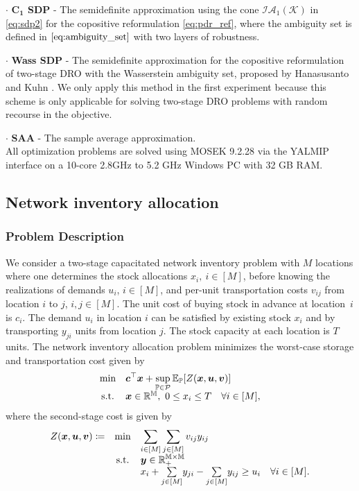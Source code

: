 \documentclass{article}
\newcommand{\st}{\textnormal{s.t.}}
\newcommand{\PP}{\mathbb{P}}
\newcommand{\EE}{\mathbb{E}}
\begin{document}
$\bm \cdot$ \textbf{$\mathbf{C_1}$ SDP} - The semidefinite approximation using the cone $\mathcal{IA}_1\mathcal{(K)}$   in \eqref{eq:sdp2}  for the copositive reformulation \eqref{eq:pdr_ref}, where the ambiguity set is defined in $\eqref{eq:ambiguity_set}$ with two layers of robustness.

$\bm \cdot$ \textbf{Wass SDP} - The semidefinite approximation for the copositive reformulation of two-stage DRO with the Wasserstein ambiguity set, proposed by Hanasusanto and Kuhn \cite{Wass-SDP}. We only apply this method in the first experiment because this scheme is only applicable for solving two-stage DRO problems with random recourse in the objective.

$\bm \cdot$ \textbf{SAA} - The sample average approximation.\\
All optimization problems are solved using MOSEK 9.2.28 via the YALMIP interface on a 10-core 2.8GHz to 5.2 GHz Windows PC with 32 GB RAM.

\subsection{Network inventory allocation}
\subsubsection{Problem Description} 
We consider a two-stage capacitated network inventory problem with $M$ locations where one determines the stock allocations $x_i,\ i \in [M]$, before knowing the realizations of demands $u_i$, $i\in [M]$, and per-unit transportation costs $v_{ij}$ from location $i$ to $j$, $i,j\in[M]$. The unit cost of buying stock in advance at location~$i$ is $c_i$. The demand $u_i$ in location $i$ can be satisfied by existing stock $x_i$ and by transporting $y_{ji}$ units from location $j$. The stock capacity at each location is $T$ units. The network inventory allocation problem minimizes the worst-case storage  and transportation cost given by
\begin{equation*}
\begin{array}{clll}
  \displaystyle  \text{min} & \displaystyle \bm c^\top \bm x + \sup_{\PP\in\mathcal P}\EE_\PP [Z(\bm x, \bm u, \bm v)] \\
  \st & \bm x \in \mathbb{R^M}, \ 0 \leq x_i \leq T \quad \forall  i \in [M], \\ 
\end{array}
\end{equation*}
where the second-stage cost is given by
\begin{equation*}
\begin{array}{ccll}
  \displaystyle Z(\bm x, \bm u, \bm v) \coloneqq & \displaystyle \text{min} & \displaystyle \sum_{i \in [M]} \sum_{j \in [M]} v_{ij}y_{ij} \\
  & \st & \bm y \in \mathbb{R_{+}^{M \times M}} \\
   &  & x_i +  \underset{j \in [M]}{\sum} y_{ji} - \underset{j \in [M]}{\sum} y_{ij} \geq u_i \quad \forall  i \in [M]. \\ 
\end{array}
\end{equation*}
\end{document}

